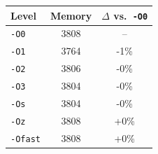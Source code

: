 \begin{tabular*}{\columnwidth}{@{\extracolsep\fill}lcc@{\extracolsep\fill}}
\toprule
\textbf{Level} & \textbf{Memory} & \textbf{$\Delta$ vs.\ \texttt{-O0}} \\
\midrule
\texttt{-O0} & 3808 & -- \\
\texttt{-O1} & 3764 & -1\% \\
\texttt{-O2} & 3806 & -0\% \\
\texttt{-O3} & 3804 & -0\% \\
\texttt{-Os} & 3804 & -0\% \\
\texttt{-Oz} & 3808 & +0\% \\
\texttt{-Ofast} & 3808 & +0\% \\
\bottomrule
\end{tabular*}
